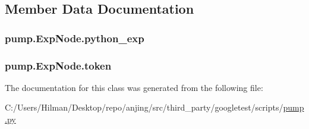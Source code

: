 \subsection{Member Data Documentation}
\hypertarget{classpump_1_1_exp_node_adccfe4778c2e34f6b2c88118c0f1587f}{}
\subsubsection[{python\+\_\+exp}]{\setlength{\rightskip}{0pt plus 5cm}pump.\+Exp\+Node.\+python\+\_\+exp}\label{classpump_1_1_exp_node_adccfe4778c2e34f6b2c88118c0f1587f}
\hypertarget{classpump_1_1_exp_node_ade05a5a32535d717dc5c194569aaf356}{}
\subsubsection[{token}]{\setlength{\rightskip}{0pt plus 5cm}pump.\+Exp\+Node.\+token}\label{classpump_1_1_exp_node_ade05a5a32535d717dc5c194569aaf356}


The documentation for this class was generated from the following file\+:\begin{DoxyCompactItemize}
\item 
C\+:/\+Users/\+Hilman/\+Desktop/repo/anjing/src/third\+\_\+party/googletest/scripts/\hyperlink{pump_8py}{pump.\+py}\end{DoxyCompactItemize}

